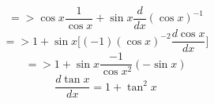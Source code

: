 \begin{displaymath}
=>\cos x \frac{1}{\cos x}+\sin x\frac{d}{dx}(\cos x)^{-1}
\end{displaymath}
\begin{displaymath}
=> 1+\sin x\bigg[(-1)(\cos x)^{-2}\frac{d\cos x}{dx}\bigg]
\end{displaymath}
\begin{displaymath}
=> 1+\sin x\frac{-1}{\cos x^2}(-\sin x)
\end{displaymath}
\begin{equation}
\frac{d \tan x}{dx} = 1 + \tan^2 x
\end{equation}

